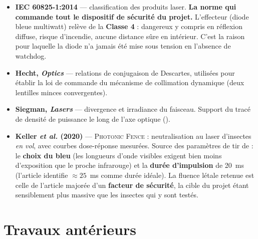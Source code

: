 \documentclass[11pt,a4paper]{article}
\begin{document}
\begin{itemize}[leftmargin=*]
  \item \textbf{IEC 60825-1:2014} \cite{iec60825} — classification des produits laser.
        \textbf{La norme qui commande tout le dispositif de sécurité du projet.}
        L'effecteur (diode bleue multiwatt) relève de la \textbf{Classe 4} : dangereux
        y compris en réflexion diffuse, risque d'incendie, aucune distance sûre en
        intérieur. C'est la raison pour laquelle la diode n'a jamais été mise sous tension
        en l'absence de watchdog.

  \item \textbf{Hecht, \emph{Optics}} \cite{hecht2016optics} — relations de conjugaison de
        Descartes, utilisées pour établir la loi de commande du mécanisme de collimation
        dynamique (deux lentilles minces convergentes).

  \item \textbf{Siegman, \emph{Lasers}} \cite{siegman1986lasers} — divergence et irradiance
        du faisceau. Support du tracé de densité de puissance le long de l'axe optique
        ().

  \item \textbf{Keller \emph{et al.} (2020)} \cite{keller2020photonicfence} —
        \textsc{Photonic Fence} : neutralisation au laser d'insectes \emph{en vol}, avec
        courbes dose-réponse mesurées. Source des paramètres de tir de
         : le \textbf{choix du bleu} (les
        longueurs d'onde visibles exigent bien moins d'exposition que le proche infrarouge)
        et la \textbf{durée d'impulsion} de 20~ms (l'article identifie $\approx 25$~ms
        comme durée idéale). La fluence létale retenue est celle de l'article majorée d'un
        \textbf{facteur de sécurité}, la cible du projet étant sensiblement plus massive
        que les insectes qui y sont testés.
\end{itemize}

\section{Travaux antérieurs}
\end{document}
